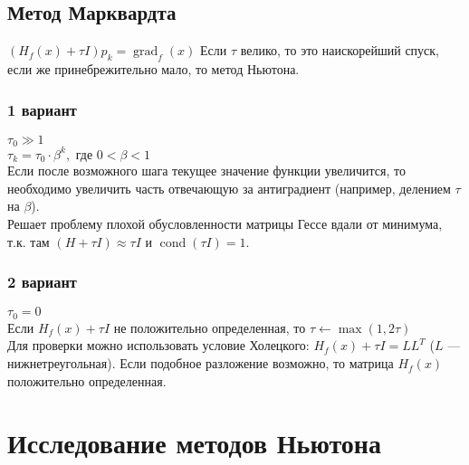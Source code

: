 \documentclass[russian, english]{article}
\begin{document}
\subsection{Метод Марквардта}
$(H_f(x) + \tau I)p_k=\operatorname{grad}_f(x)$
Если $\tau$ велико, то это наискорейший спуск, если же принебрежительно мало, то метод Ньютона.
\subsubsection{1 вариант}
$\tau_0 \gg 1$\\
$\tau_k = \tau_0\cdot \beta^k, \text{ где } 0 < \beta < 1$\\
Если после возможного шага текущее значение функции увеличится, то необходимо увеличить часть отвечающую за антиградиент (например, делением $\tau$ на $\beta$).\\
Решает проблему плохой обусловленности матрицы Гессе вдали от минимума, т.к. там $(H+\tau I)\approx\tau I$ и $\operatorname{cond}(\tau I) = 1$.
\subsubsection{2 вариант}
$\tau_0 = 0$\\
Если $H_f(x) + \tau I$ не положительно определенная, то $\tau \leftarrow \operatorname{max}(1, 2\tau)$\\
Для проверки можно использовать условие Холецкого: $H_f(x)+\tau I = LL^T$ ($L$ --- нижнетреугольная). Если подобное разложение возможно, то матрица $H_f(x)$ положительно определенная.

\section{Исследование методов Ньютона}

\newcommand{\MakePlots}[6]{
	$z(x, y) = #2$\\
	\begin{tikzpicture}
	\begin{axis}[
		legend style={at={(0.5,-0.3)},anchor=north},
		xlabel = {x},
		ylabel = {y},
		zlabel = {z},
		#5
	]
		\addplot3[surf, opacity=0.8, forget plot, #6] {#1};
		\foreach \suff/\fancy in #4 {
			\edef\temp{\noexpand\addlegendentry{\fancy}}
			\addplot3 table[col sep=tab]{#3/\suff%
Traj.tsv};
			\temp
		}
	\end{axis}
	\end{tikzpicture}\\
	\begingroup
		\toks0={#3}%
		\edef\param{\the\toks0}%
	\expandafter\endgroup
	\ifx\param\empty
	\else
		\csvautotabular[separator=tab]{#3/iters.tsv}\\
	\fi
}
\end{document}
